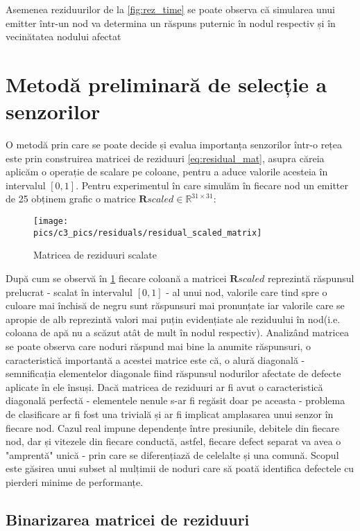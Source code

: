 Asemenea reziduurilor de la \ref{fig:rez_time} se poate observa că simularea unui emitter într-un nod va determina un răspuns puternic în nodul respectiv și în vecinătatea nodului afectat

\section{Metodă preliminară de selecție a senzorilor}
\label{sec:sensor_selection}
O metodă prin care se poate decide și evalua importanța senzorilor într-o rețea este prin construirea matricei de reziduuri \eqref{eq:residual_mat}, asupra căreia aplicăm o operație de scalare pe coloane, pentru a aduce valorile acesteia în intervalul $[0,1]$. Pentru experimentul în care simulăm în fiecare nod un emitter de 25 obținem grafic o matrice $\mathbf{R}scaled \in \mathbb{R}^{31 \times 31}$:

\begin{figure}[H]
\centering
\texttt{[image: \\pics/c3\_pics/residuals/residual\_scaled\_matrix]}
\caption{Matricea de reziduuri scalate}
\label{fig:rez_scaled_matrix_img}
\end{figure} 

După cum se observă în \ref{fig:rez_scaled_matrix_img} fiecare coloană a matricei $\mathbf{R}scaled$ reprezintă răspunsul prelucrat - scalat în intervalul $[0,1]$ - al unui nod, valorile care tind spre o culoare mai închisă de negru sunt răspunsuri mai pronunțate iar valorile care se apropie de alb reprezintă valori mai puțin evidențiate ale reziduului în nod(i.e. coloana de apă nu a scăzut atât de mult în nodul respectiv). Analizând matricea se poate observa care noduri răspund mai bine la anumite răspunsuri, o caracteristică importantă a acestei matrice este că, o alură diagonală - semnificația elementelor diagonale fiind răspunsul nodurilor afectate de defecte aplicate în ele însuși. Dacă matricea de reziduuri ar fi avut o caracteristică diagonală perfectă - elementele nenule s-ar fi regăsit doar pe aceasta - problema de clasificare ar fi fost una trivială și ar fi implicat amplasarea unui senzor în fiecare nod. Cazul real impune dependențe între presiunile, debitele din fiecare nod, dar și vitezele din fiecare conductă, astfel, fiecare defect separat va avea o "amprentă" unică - prin care se diferențiază de celelalte și una comună. Scopul este găsirea unui subset al mulțimii de noduri care să poată identifica defectele cu pierderi minime de performanțe.


\subsection{Binarizarea matricei de reziduuri}

